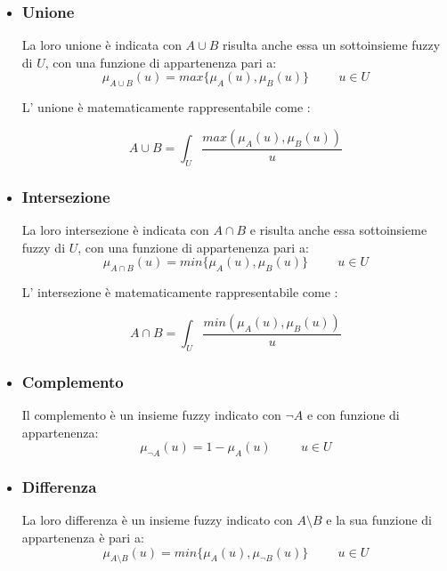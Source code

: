 \documentclass[a4paper,12pt]{report}
\begin{document}
\begin{itemize}
    \item \subsubsection{Unione}
La loro unione è indicata con $A \cup B$ risulta anche essa un sottoinsieme fuzzy di $U$, con una funzione di appartenenza pari a:
\begin{equation*}
    \mu_{A\cup B} (u) = max\{\mu_A(u),\mu_B(u)\} \hspace{1cm}  u\in U
\end{equation*}

L' unione è matematicamente rappresentabile come :

\begin{equation*}
    A \cup B = \int_{U} \frac{max(\mu_A(u),\mu_B(u))}{u}
\end{equation*}

\item \subsubsection{Intersezione}
La loro intersezione è indicata con $A \cap B$ e risulta anche essa sottoinsieme fuzzy di $U$, con una funzione di appartenenza pari a:
\begin{equation*}
    \mu_{A \cap B} (u) = min\{\mu_A(u),\mu_B(u)\} \hspace{1cm}  u\in U
\end{equation*}

L' intersezione è matematicamente rappresentabile come :

\begin{equation*}
    A \cap B = \int_{U} \frac{min(\mu_A(u),\mu_B(u))}{u}
\end{equation*}

\item \subsubsection{Complemento}
Il complemento è un insieme fuzzy indicato con $\neg A$ e con funzione di appartenenza:
\begin{equation*}
    \mu_{\neg A}(u) = 1 - \mu_A(u) \hspace{1cm}  u\in U
\end{equation*}

\item \subsubsection{Differenza}
La loro differenza è un insieme fuzzy indicato con $A \setminus B$ e la sua funzione di appartenenza è pari a:
\begin{equation*}
    \mu_{A \setminus B} (u) = min\{\mu_A(u),\mu_{\neg B}(u)\} \hspace{1cm}  u\in U
\end{equation*}


\end{itemize}
\end{document}
